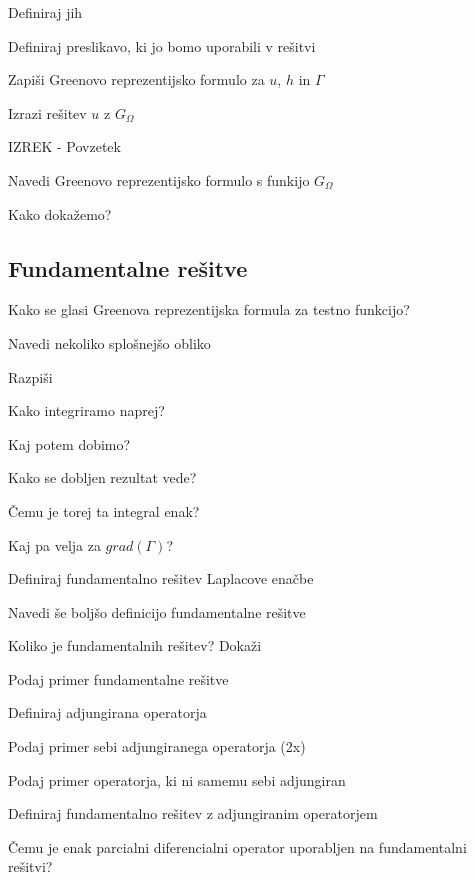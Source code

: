 \documentclass{article}
\begin{document}
\begin{enumerate}
        {\color{red}\item Definiraj jih}
        \item Definiraj preslikavo, ki jo bomo uporabili v rešitvi
        {\color{red}\item Zapiši Greenovo reprezentijsko formulo za $u$, $h$ in $\Gamma$}
        {\color{red}\item Izrazi rešitev $u$ z $G_{\Omega}$}
        {\color{red}\item IZREK - Povzetek}
        \item Navedi Greenovo reprezentijsko formulo s funkijo $G_{\Omega}$ 
        \item Kako dokažemo?
    \end{enumerate}
    
    \subsection{Fundamentalne rešitve}
    \begin{enumerate}
        {\color{red}\item Kako se glasi Greenova reprezentijska formula za testno funkcijo?}
        {\color{red}\item Navedi nekoliko splošnejšo obliko}
        \item Razpiši
        {\color{red}\item Kako integriramo naprej?}
        {\color{red}\item Kaj potem dobimo?}
        {\color{red}\item Kako se dobljen rezultat vede?}
        {\color{red}\item Čemu je torej ta integral enak?}
        {\color{red}\item Kaj pa velja za $grad(\Gamma)$?}
        {\color{red}\item Definiraj fundamentalno rešitev Laplacove enačbe}
        {\color{red}\item Navedi še boljšo definicijo fundamentalne rešitve}
        {\color{red}\item Koliko je fundamentalnih rešitev? Dokaži}
        {\color{red}\item Podaj primer fundamentalne rešitve}
        {\color{red}\item Definiraj adjungirana operatorja}
        \item Podaj primer sebi adjungiranega operatorja (2x) 
        \item Podaj primer operatorja, ki ni samemu sebi adjungiran
        {\color{red}\item Definiraj fundamentalno rešitev z adjungiranim operatorjem}
        {\color{red}\item Čemu je enak parcialni diferencialni operator uporabljen na fundamentalni rešitvi?}
    \end{enumerate}
\end{document}
